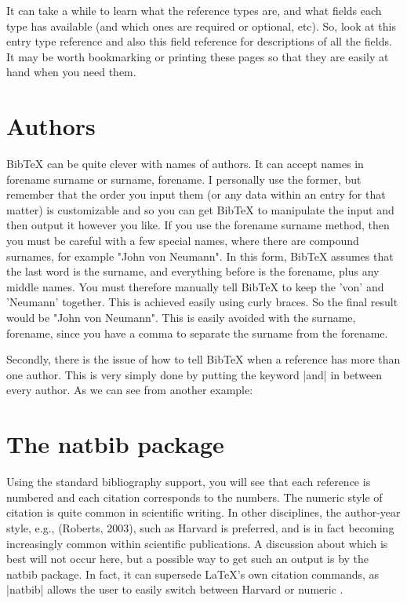 It can take a while to learn what the reference types are, and what fields each type has available (and which ones are required or optional, etc). So, look at this entry type reference and also this field reference for descriptions of all the fields. It may be worth bookmarking or printing these pages so that they are easily at hand when you need them.

\section{Authors}

BibTeX can be quite clever with names of authors. It can accept names in forename surname or surname, forename. I personally use the former, but remember that the order you input them (or any data within an entry for that matter) is customizable and so you can get BibTeX to manipulate the input and then output it however you like. If you use the forename surname method, then you must be careful with a few special names, where there are compound surnames, for example "John von Neumann". In this form, BibTeX assumes that the last word is the surname, and everything before is the forename, plus any middle names. You must therefore manually tell BibTeX to keep the 'von' and 'Neumann' together. This is achieved easily using curly braces. So the final result would be "John {von Neumann}". This is easily avoided with the surname, forename, since you have a comma to separate the surname from the forename.

Secondly, there is the issue of how to tell BibTeX when a reference has more than one author. This is very simply done by putting the keyword |and| in between every author. As we can see from another example:


\section{The natbib package}

Using the standard \latex bibliography support, you will see that each reference is numbered and each citation corresponds to the numbers. The numeric style of citation is quite common in scientific writing. In other disciplines, the author-year style, e.g., (Roberts, 2003), such as Harvard is preferred, and is in fact becoming increasingly common within scientific publications. A discussion about which is best will not occur here, but a possible way to get such an output is by the natbib package. In fact, it can supersede LaTeX's own citation commands, as |natbib| allows the user to easily switch between Harvard or numeric \citep{natbib2009}.


